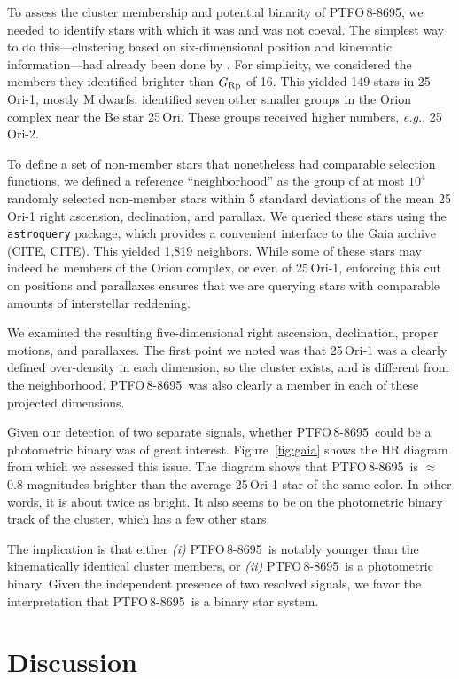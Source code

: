 \documentclass[12pt,twocolumn,tighten]{aastex62}
\newcommand{\ptfo}{PTFO$\,$8-8695}
\begin{document}
To assess the cluster membership and potential
binarity of \ptfo, we needed to identify stars with which it was and was
not coeval.  The simplest way to do this---clustering based on
six-dimensional position and kinematic information---had already been
done by \citet{kounkel_apogee2_2018}.  For simplicity, we considered
the members they identified brighter than $G_{\rm Rp}$ of 16.  This
yielded 149 stars in 25$\,$Ori-1, mostly M dwarfs.
\citet{kounkel_apogee2_2018} identified seven other smaller
groups in the Orion complex near the Be star 25$\,$Ori. These groups
received higher numbers, {\it e.g.}, 25$\,$Ori-2.

To define a set of non-member stars that nonetheless had comparable selection
functions, we defined a reference ``neighborhood'' as the group of at
most $10^4$ randomly selected non-member stars within 5 standard
deviations of the mean 25$\,$Ori-1 right ascension, declination, and
parallax.  We queried these stars using the \texttt{astroquery}
package, which provides a convenient interface to the Gaia archive
(CITE, CITE).  This yielded 1{,}819 neighbors.  While some of
these stars may indeed be members of the Orion complex, or even of
25$\,$Ori-1, enforcing this cut on positions and parallaxes ensures
that we are querying stars with comparable amounts of interstellar
reddening.

We examined the resulting five-dimensional right ascension,
declination, proper motions, and parallaxes.  The first point we noted
was that 25$\,$Ori-1 was a clearly defined over-density in each
dimension, so the cluster exists, and is different from the
neighborhood.  \ptfo\ was also clearly a member in each of these
projected dimensions.

Given our detection of two separate signals, whether
\ptfo\ could be a photometric binary was of great interest.
Figure~\ref{fig:gaia} shows the HR diagram from which we assessed
this issue.
The diagram shows that \ptfo\ is $\approx$0.8 magnitudes brighter than the average
25$\,$Ori-1 star of the same color.
In other words, it is about twice as bright.
It also seems to be on the photometric binary track of the cluster, which has a few other stars.

The implication is that either 
{\it (i)} \ptfo\ is notably younger than the kinematically identical cluster members, or
{\it (ii)} \ptfo\ is a photometric binary.
Given the independent presence of two resolved signals,
we favor the interpretation that \ptfo\ is a binary star system.


\section{Discussion}
\label{sec:discussion}
\end{document}
